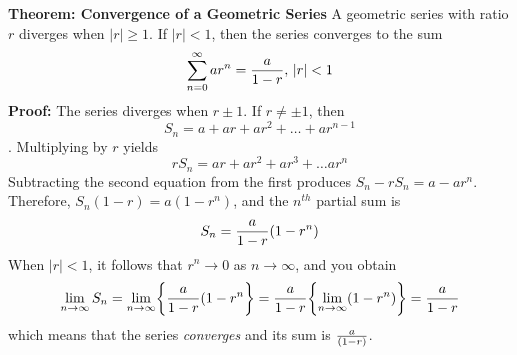 \nopagenumbers
{\bf Theorem: Convergence of a Geometric Series}
\vskip 6pt
A geometric series with ratio $r$ diverges when $|r| \geq 1$. If $|r|<1$, then the series converges to the sum $$\sum_{n=0}^\infty ar^n={a \over 1-r}, \, |r|<1$$
\vskip 10pt
{\bf Proof:}
\vskip 6pt
The series diverges when $r \pm 1$. If $r\neq \pm 1$, then $$S_n=a+ar+ar^2+\ldots +ar^{n-1}$$. Multiplying by $r$ yields $$rS_n=ar+ar^2+ar^3+ \ldots ar^n$$ Subtracting the second equation from the first produces $S_n-rS_n=a-ar^n$. Therefore, $S_n(1-r)=a(1-r^n)$, and the $n^{th}$ partial sum is $$S_n={a \over 1-r}(1-r^n)$$ When $|r|<1$, it follows that $r^n\to 0$ as $n\to \infty$, and you obtain $$\lim_{n\to\infty}S_n=\lim_{n\to\infty}\biggl\lbrace {a \over 1-r}(1-r^n \biggr\rbrace = {a\over 1-r} \biggl\lbrace \lim_{n\to\infty}(1-r^n) \biggr\rbrace ={a\over 1-r}$$ which means that the series {\it converges} and its sum is ${a \over (1-r)}$.


\vfill\eject
